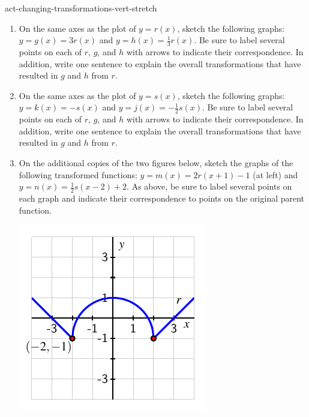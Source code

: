 \documentclass{ximera}
\begin{document}
\begin{exploration}{}{act-changing-transformations-vert-stretch}
\begin{enumerate}[label=\alph*.]
\item
On the same axes as the plot of \(y = r(x)\), sketch the following graphs:  \(y = g(x) = 3r(x)\) and \(y = h(x) = \frac{1}{3}r(x)\).  Be sure to label several points on each of \(r\), \(g\), and \(h\) with arrows to indicate their correspondence.  In addition, write one sentence to explain the overall transformations that have resulted in \(g\) and \(h\) from \(r\).%
\item
On the same axes as the plot of \(y = s(x)\), sketch the following graphs:  \(y = k(x) = -s(x)\) and \(y = j(x) = -\frac{1}{2}s(x)\).  Be sure to label several points on each of \(r\), \(g\), and \(h\) with arrows to indicate their correspondence.  In addition, write one sentence to explain the overall transformations that have resulted in \(g\) and \(h\) from \(r\).%
\item On the additional copies of the two figures below, sketch the graphs of the following transformed functions:  \(y = m(x) = 2r(x+1)-1\) (at left) and \(y = n(x) = \frac{1}{2}s(x-2)+2\).  As above, be sure to label several points on each graph and indicate their correspondence to points on the original parent function.%
\begin{image}
\includegraphics[width=1\linewidth]{images/transformations-act-r-translation}


\end{image}
\end{enumerate}
\end{exploration}
\end{document}
